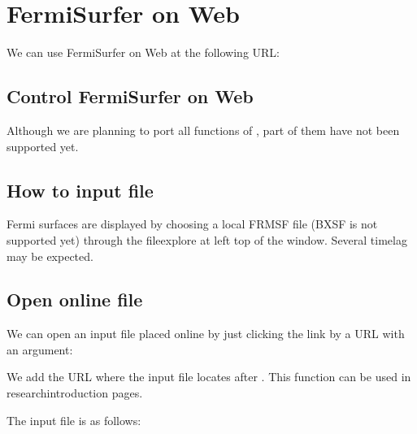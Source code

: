 \documentclass[letterpaper,10pt,pdftex,openany,english]{sphinxmanual}
\begin{document}
\chapter{FermiSurfer on Web}
\label{\detokenize{onweb:fermisurfer-on-web}}\label{\detokenize{onweb::doc}}
\sphinxAtStartPar
We can use FermiSurfer on Web at the following URL:


\section{Control FermiSurfer on Web}
\label{\detokenize{onweb:control-fermisurfer-on-web}}
\sphinxAtStartPar
Although we are planning to port all functions of {\hyperref[\detokenize{ops:ops}]{}},
part of them have not been supported yet.


\section{How to input file}
\label{\detokenize{onweb:how-to-input-file}}
\sphinxAtStartPar
Fermi surfaces are displayed by choosing a local FRMSF file (BXSF is not supported yet)
through the file\sphinxhyphen{}explore at left top of the window.
Several time\sphinxhyphen{}lag may be expected.


\section{Open online file}
\label{\detokenize{onweb:open-online-file}}
\sphinxAtStartPar
We can open an input file placed online by just clicking the link by a URL with an argument:

\sphinxAtStartPar
{}

\sphinxAtStartPar
We add the URL where the input file locates after .
This function can be used in research\sphinxhyphen{}introduction pages.

\sphinxAtStartPar
The input file  is as follows:

\begin{sphinxVerbatim}[commandchars=\\\{\}]
\end{sphinxVerbatim}
\end{document}
